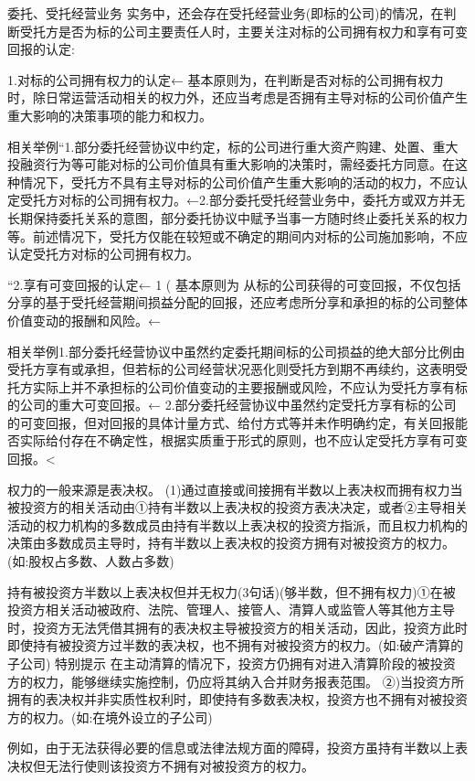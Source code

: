 \documentclass[UTF8,12pt]{ctexart}
\numberwithin{equation}{section} %
\numberwithin{figure}{section}
\numberwithin{table}{section}
\begin{document}
	委托、受托经营业务
	实务中，还会存在受托经营业务(即标的公司)的情况，在判断受托方是否为标的公司主要责任人时，主要关注对标的公司拥有权力和享有可变回报的认定:

	1.对标的公司拥有权力的认定←
	基本原则为，在判断是否对标的公司拥有权力时，除日常运营活动相关的权力外，还应当考虑是否拥有主导对标的公司价值产生重大影响的决策事项的能力和权力。
	
	相关举例“1.部分委托经营协议中约定，标的公司进行重大资产购建、处置、重大投融资行为等可能对标的公司价值具有重大影响的决策时，需经委托方同意。在这种情况下，受托方不具有主导对标的公司价值产生重大影响的活动的权力，不应认定受托方对标的公司拥有权力。←2.部分委托受托经营业务中，委托方或双方并无长期保持委托关系的意图，部分委托协议中赋予当事一方随时终止委托关系的权力等。前述情况下，受托方仅能在较短或不确定的期间内对标的公司施加影响，不应认定受托方对标的公司拥有权力。
	
	“2.享有可变回报的认定←
	1
	(
	基本原则为
	从标的公司获得的可变回报，不仅包括分享的基于受托经营期间损益分配的回报，还应考虑所分享和承担的标的公司整体价值变动的报酬和风险。←
	
	相关举例1.部分委托经营协议中虽然约定委托期间标的公司损益的绝大部分比例由受托方享有或承担，但若标的公司经营状况恶化则受托方到期不再续约，这表明受托方实际上并不承担标的公司价值变动的主要报酬或风险，不应认为受托方享有标的公司的重大可变回报。←
	2.部分委托经营协议中虽然约定受托方享有标的公司的可变回报，但对回报的具体计量方式、给付方式等并未作明确约定，有关回报能否实际给付存在不确定性，根据实质重于形式的原则，也不应认定受托方享有可变回报。<
	
	权力的一般来源是表决权。
	(1)通过直接或间接拥有半数以上表决权而拥有权力当被投资方的相关活动由①持有半数以上表决权的投资方表决决定，或者②主导相关活动的权力机构的多数成员由持有半数以上表决权的投资方指派，而且权力机构的决策由多数成员主导时，持有半数以上表决权的投资方拥有对被投资方的权力。(如:股权占多数、人数占多数)
	
	持有被投资方半数以上表决权但并无权力(3句话)(够半数，但不拥有权力)①在被投资方相关活动被政府、法院、管理人、接管人、清算人或监管人等其他方主导时，投资方无法凭借其拥有的表决权主导被投资方的相关活动，因此，投资方此时即使持有被投资方过半数的表决权，也不拥有对被投资方的权力。(如:破产清算的子公司)
	特别提示
	在主动清算的情况下，投资方仍拥有对进入清算阶段的被投资方的权力，能够继续实施控制，仍应将其纳入合并财务报表范围。
	②)当投资方所拥有的表决权并非实质性权利时，即使持有多数表决权，投资方也不拥有对被投资方的权力。(如:在境外设立的子公司)
	
	例如，由于无法获得必要的信息或法律法规方面的障碍，投资方虽持有半数以上表决权但无法行使则该投资方不拥有对被投资方的权力。
	
\end{document}
